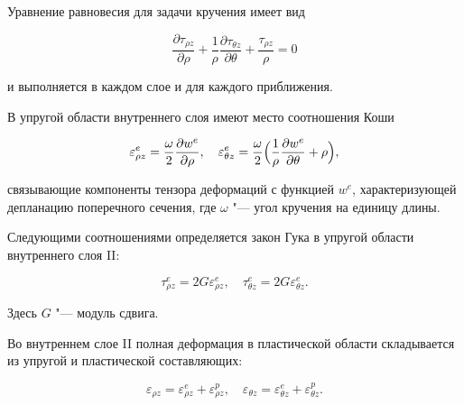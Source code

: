 Уравнение равновесия для задачи кручения имеет вид

 \begin{equation}

\label{kovalev:eq_5}

  \dfrac{\partial\tau_{\rho z}}{\partial\rho}+\dfrac1{\rho}\dfrac{\partial \tau_{\theta z}}{\partial\theta}+\dfrac{\tau_{\rho z}}{\rho}=0

 \end{equation}

и выполняется в каждом слое и для каждого приближения.



В упругой области внутреннего слоя имеют место соотношения Коши

 \begin{equation}

\label{kovalev:eq_6}

  \varepsilon_{\rho z}^e=\dfrac{\omega}{2}\dfrac{\partial w^e}{\partial \rho}, \quad

  \varepsilon_{\theta z}^e=\dfrac{\omega}{2}\Bigl(\dfrac1{\rho}\dfrac{\partial w^e}{\partial\theta}+\rho\Bigr),

 \end{equation}

связывающие компоненты тензора деформаций с функцией $w^e$, характеризующей депланацию поперечного сечения, где $\omega$ "--- угол кручения на единицу длины.



Следующими соотношениями определяется закон Гука в упругой области внутреннего слоя II:

 \begin{equation}

\label{kovalev:eq_7}

  \tau_{\rho z}^e=2G\varepsilon_{\rho z}^e, \quad \tau_{\theta z}^e=2G\varepsilon_{\theta z}^e.

 \end{equation}

Здесь $G$ "--- модуль сдвига.



Во внутреннем слое II полная деформация в пластической области складывается из упругой и пластической составляющих:

 \begin{equation}

\label{kovalev:eq_8}

  \varepsilon_{\rho z}=\varepsilon_{\rho z}^e+\varepsilon_{\rho z}^p, \quad

  \varepsilon_{\theta z}=\varepsilon_{\theta z}^e+\varepsilon_{\theta z}^p.

 \end{equation}

